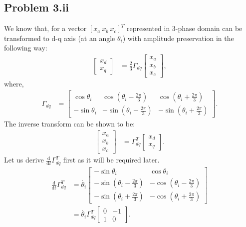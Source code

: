\subsection*{Problem 3.ii}
We know that, for a vector $[x_a\ x_b\ x_c]^T$ represented in $3$-phase domain can be transformed to d-q axis (at an angle $\theta_i$) with amplitude preservation in the following way:
\begin{align*}
	\begin{bmatrix}
		x_d\\x_q
	\end{bmatrix} &= \frac{2}{3}\Gamma_{dq}\begin{bmatrix}
		x_a\\x_b\\x_c
	\end{bmatrix},
\end{align*}
where,
\begin{align*}
	\Gamma_{dq} &= \begin{bmatrix}
		\cos \theta_i & \cos (\theta_i - \frac{2\pi}{3}) & \cos (\theta_i + \frac{2\pi}{3})\\
		-\sin \theta_i & -\sin (\theta_i - \frac{2\pi}{3}) & -\sin (\theta_i + \frac{2\pi}{3})
	\end{bmatrix}.
\end{align*}
The inverse transform can be shown to be:
\begin{align*}
	\begin{bmatrix}
		x_a\\x_b\\x_c
	\end{bmatrix} &= \Gamma_{dq}^T \begin{bmatrix}
		x_d\\x_q
	\end{bmatrix}.
\end{align*}
Let us derive $\frac{\text{d}}{\text{d}t}\Gamma_{dq}^T$ first as it will be required later.
\begin{align*}
	\frac{\text{d}}{\text{d}t} \Gamma_{dq}^T &= \dot{\theta_i}\begin{bmatrix}
		-\sin \theta_i & \cos \theta_i\\
		-\sin (\theta_i-\frac{2\pi}{3}) & -\cos (\theta_i-\frac{2\pi}{3})\\
		-\sin (\theta_i+\frac{2\pi}{3}) & -\cos (\theta_i+\frac{2\pi}{3}) 
	\end{bmatrix} \\
	&= \dot{\theta_i} \Gamma_{dq}^T \begin{bmatrix}
		0 & -1\\1 & 0
	\end{bmatrix}.
\end{align*}

